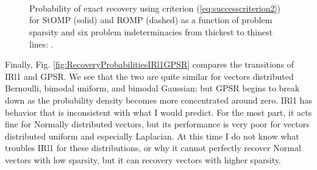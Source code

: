 \documentclass[11pt,draftcls,onecolumn]{IEEEtran}
\begin{document}
\begin{figure}[htb]
\centering
{}\hspace{-0.1in}
\\ \vspace{-0.1in}

\hspace{-0.1in}
\\ \vspace{-0.1in}

\hspace{-0.1in}
\\ \vspace{-0.1in}

\caption{Probability of exact recovery using criterion (\ref{eq:successcriterion2}) 
for StOMP (solid) and ROMP (dashed) as a function of problem sparsity
and six problem indeterminacies from thickest to thinest lines: 
.}
\label{fig:RecoveryProbabilitiesStOMPROMP}
\end{figure}

Finally, Fig. \ref{fig:RecoveryProbabilitiesIRl1GPSR} compares 
the transitions of IRl1 and GPSR.
We see that the two are quite similar for vectors distributed
Bernoulli, bimodal uniform, and bimodal Gaussian;
but GPSR begins to break down as the probability density
becomes more concentrated around zero.
IRl1 has behavior that is inconsistent with what I would predict.
For the most part, it acts fine for Normally distributed vectors,
but its performance is very poor
for vectors distributed uniform and especially Laplacian.
At this time I do not know what troubles IRl1
for these distributions,
or why it cannot perfectly recover Normal vectors with low sparsity,
but it can recovery vectors with higher sparsity.
\end{document}
